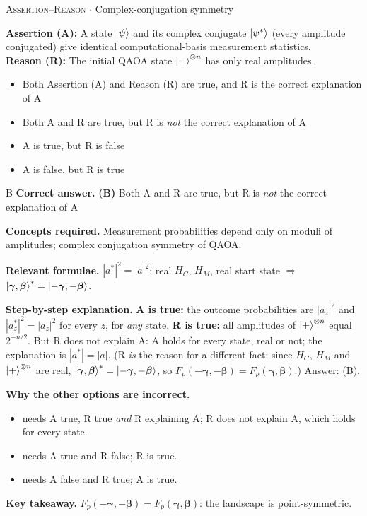 \documentclass[11pt,a4paper]{article}
\newcommand{\optlabel}[1]{\textbf{(#1)}}
\newcommand{\correctlabel}[1]{\textcolor{okgreen}{\textbf{(#1)}\,\ding{51}}}
\newenvironment{qitem}[1]{\begin{list}{}{\setlength{\leftmargin}{3.3em}\setlength{\labelwidth}{3.1em}%
  \setlength{\labelsep}{0.2em}\setlength{\topsep}{3pt}\setlength{\parsep}{3pt}}\item[\textbf{Q.#1}\hfill]}{\end{list}}
\newcommand{\qsep}{\par\vspace{2pt}{\color{black!15}\hrule}\vspace{4pt}}
\newcommand{\qmeta}[2]{{\footnotesize\color{black!60}\textsc{#1} \;$\cdot$\; #2}\par}
\begin{document}
\begin{qitem}{35}
\qmeta{Assertion--Reason}{Complex-conjugation symmetry}
\textbf{Assertion (A):} A state $\ket\psi$ and its complex conjugate $\ket{\psi^*}$ (every amplitude conjugated) give
identical computational-basis measurement statistics.\\[1mm]
\textbf{Reason (R):} The initial QAOA state $\ket{+}^{\otimes n}$ has only real amplitudes.
\begin{itemize}[leftmargin=2.6em, labelsep=0.4em, itemsep=2pt, topsep=3pt]
\item[\optlabel{A}] Both Assertion (A) and Reason (R) are true, and R is the correct explanation of A
\item[\correctlabel{B}] Both A and R are true, but R is \emph{not} the correct explanation of A
\item[\optlabel{C}] A is true, but R is false
\item[\optlabel{D}] A is false, but R is true
\end{itemize}
\end{qitem}
\begin{solbox}{B}
\textbf{\color{brand}Correct answer.} \textcolor{okgreen}{\textbf{(B)}} Both A and R are true, but R is \emph{not} the correct explanation of A

\textbf{\color{brand}Concepts required.} Measurement probabilities depend only on moduli of amplitudes; complex conjugation symmetry of QAOA.

\textbf{\color{brand}Relevant formulae.} $|a^*|^2 = |a|^2$; real $H_C$, $H_M$, real start state $\Rightarrow$ $\ket{\boldsymbol\gamma,\boldsymbol\beta}^* = \ket{-\boldsymbol\gamma,-\boldsymbol\beta}$.

\textbf{\color{brand}Step-by-step explanation.} \textbf{A is true:} the outcome probabilities are $|a_z|^2$ and $|a_z^*|^2 = |a_z|^2$ for every $z$, for \emph{any} state.
\textbf{R is true:} all amplitudes of $\ket+^{\otimes n}$ equal $2^{-n/2}$.
But R does not explain A: A holds for every state, real or not; the explanation is $|a^*| = |a|$.
(R \emph{is} the reason for a different fact: since $H_C$, $H_M$ and $\ket+^{\otimes n}$ are real,
$\ket{\boldsymbol\gamma,\boldsymbol\beta}^* = \ket{-\boldsymbol\gamma, -\boldsymbol\beta}$, so $F_p(-\boldsymbol\gamma, -\boldsymbol\beta) = F_p(\boldsymbol\gamma, \boldsymbol\beta)$.) Answer: (B).

\textbf{\color{brand}Why the other options are incorrect.}
\begin{itemize}[leftmargin=2.4em, itemsep=1pt, topsep=2pt]
\item[\textbf{(A)}] needs A true, R true \emph{and} R explaining A; R does not explain A, which holds for every state.
\item[\textbf{(C)}] needs A true and R false; R is true.
\item[\textbf{(D)}] needs A false and R true; A is true.
\end{itemize}
\textbf{\color{brand}Key takeaway.} $F_p(-\boldsymbol\gamma, -\boldsymbol\beta) = F_p(\boldsymbol\gamma, \boldsymbol\beta)$: the landscape is point-symmetric.
\end{solbox}
\qsep
\end{document}
